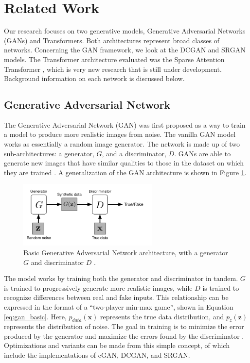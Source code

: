 \documentclass[letterpaper]{article} %
\begin{document}
\section{Related Work}
Our research focuses on two generative models,
Generative Adversarial Networks (GANs) and Transformers.
Both architectures represent broad classes of networks.
Concerning the GAN framework, we look at the
DCGAN
\cite{generative_adversarial_networks} and SRGAN
\cite{srgan} models.
The Transformer architecture evaluated was the Sparse Attention Transformer
\cite{generative_transformers}, which is very new research that is
still under development.
Background information on each network is discussed below.

\subsection{Generative Adversarial Network}
The Generative Adversarial Network (GAN)
was first proposed as a way to train a model to produce more realistic images
from noise. The vanilla GAN model works as essentially a random image generator.
The network is made up of two sub-architectures:
a generator, $G$, and a discriminator, $D$.
GANs are able to generate new images that have similar qualities to
those in the dataset on which they are trained
\cite{generative_adversarial_networks}.
A generalization of the GAN architecture is shown in Figure \ref{fig:gan_architecture}.

\begin{figure}[htbp]
\centerline{\includegraphics[width=7cm]{gan_architecture.png}}
\caption{Basic Generative Adversarial Network architecture, with a generator $G$
and discriminator $D$
\cite{cgan}.}
\label{fig:gan_architecture}
\end{figure}

The model works by training both the generator and
discriminator in tandem.
$G$ is trained to progressively generate more realistic images,
while $D$ is trained to recognize differences between real and fake inputs.
This relationship can be expressed in the format of a
``two-player min-max game'', shown in Equation \ref{eq:gan_basic}.
Here, $p_{data}(\mathbf{x})$ represents the true data distribution,
and $p_{z}(\mathbf{z})$ represents the distribution of noise.
The goal in training is to minimize the error produced by the generator
and maximize the errors found by the discriminator \cite{cgan}.
Optimizations and variants can be made from this simple concept, of which include
the implementations of cGAN, DCGAN, and SRGAN.
\end{document}
